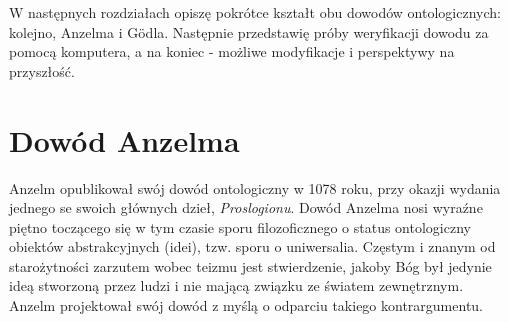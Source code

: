 \documentclass[runningheads]{llncs}
\begin{document}
W następnych rozdziałach opiszę pokrótce kształt obu dowodów ontologicznych: kolejno, Anzelma i G\"odla. Następnie przedstawię próby weryfikacji dowodu za pomocą komputera, a na koniec - możliwe modyfikacje i perspektywy na przyszłość. 

\section{Dowód Anzelma}
Anzelm opublikował swój dowód ontologiczny w 1078 roku, przy okazji wydania jednego se swoich głównych dzieł, \textit{Proslogionu}. Dowód Anzelma nosi wyraźne piętno toczącego się w tym czasie sporu filozoficznego o status ontologiczny obiektów abstrakcyjnych (idei), tzw. sporu o uniwersalia. 
Częstym i znanym od starożytności zarzutem wobec teizmu jest stwierdzenie, jakoby Bóg był jedynie ideą stworzoną przez ludzi i nie mającą związku ze światem zewnętrznym. Anzelm projektował swój dowód z myślą o odparciu takiego kontrargumentu. 
\end{document}
